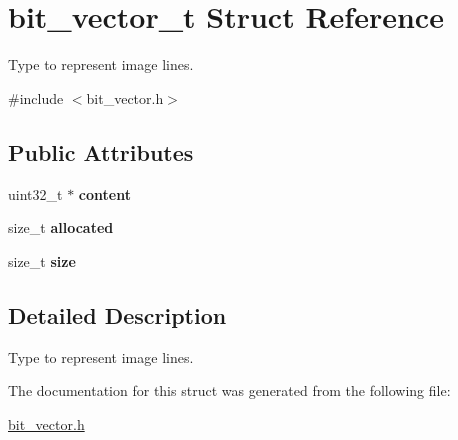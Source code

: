 \hypertarget{structbit__vector__t}{}\section{bit\+\_\+vector\+\_\+t Struct Reference}
\label{structbit__vector__t}


Type to represent image lines.  




{\ttfamily \#include $<$bit\+\_\+vector.\+h$>$}

\subsection*{Public Attributes}
\begin{DoxyCompactItemize}
\item 
\mbox{\label{structbit__vector__t_a8fc1fd73e587b505c039fa59da0ea209}} 
uint32\+\_\+t $\ast$ {\bfseries content}
\item 
\mbox{\label{structbit__vector__t_a5c168e0b911eb2fc92bc19775b9afb04}} 
size\+\_\+t {\bfseries allocated}
\item 
\mbox{\label{structbit__vector__t_a26322efc4717f94197f517f26b050c62}} 
size\+\_\+t {\bfseries size}
\end{DoxyCompactItemize}


\subsection{Detailed Description}
Type to represent image lines. 

The documentation for this struct was generated from the following file\+:\begin{DoxyCompactItemize}
\item 
\hyperlink{bit__vector_8h}{bit\+\_\+vector.\+h}\end{DoxyCompactItemize}
